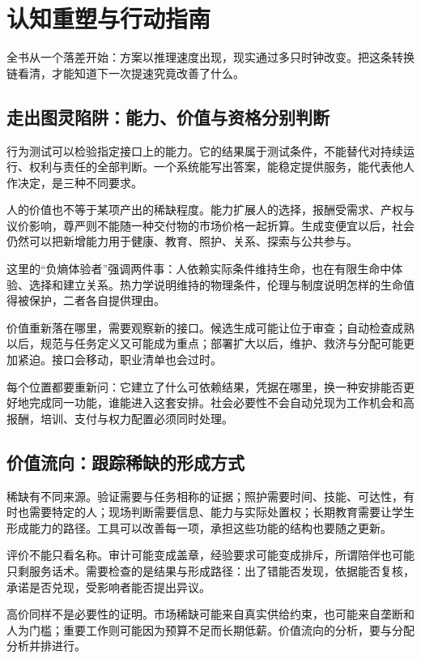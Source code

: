 \section{认知重塑与行动指南}

全书从一个落差开始：方案以推理速度出现，现实通过多只时钟改变。把这条转换链看清，才能知道下一次提速究竟改善了什么。

\subsection{走出图灵陷阱：能力、价值与资格分别判断}

行为测试可以检验指定接口上的能力。它的结果属于测试条件，不能替代对持续运行、权利与责任的全部判断。一个系统能写出答案，能稳定提供服务，能代表他人作决定，是三种不同要求。

人的价值也不等于某项产出的稀缺程度。能力扩展人的选择，报酬受需求、产权与议价影响，尊严则不能随一种交付物的市场价格一起折算。生成变便宜以后，社会仍然可以把新增能力用于健康、教育、照护、关系、探索与公共参与。

这里的“负熵体验者”强调两件事：人依赖实际条件维持生命，也在有限生命中体验、选择和建立关系。热力学说明维持的物理条件，伦理与制度说明怎样的生命值得被保护，二者各自提供理由。

价值重新落在哪里，需要观察新的接口。候选生成可能让位于审查；自动检查成熟以后，规范与任务定义又可能成为重点；部署扩大以后，维护、救济与分配可能更加紧迫。接口会移动，职业清单也会过时。

每个位置都要重新问：它建立了什么可依赖结果，凭据在哪里，换一种安排能否更好地完成同一功能，谁能进入这套安排。社会必要性不会自动兑现为工作机会和高报酬，培训、支付与权力配置必须同时处理。

\subsection{价值流向：跟踪稀缺的形成方式}

稀缺有不同来源。验证需要与任务相称的证据；照护需要时间、技能、可达性，有时也需要特定的人；现场判断需要信息、能力与实际处置权；长期教育需要让学生形成能力的路径。工具可以改善每一项，承担这些功能的结构也要随之更新。

评价不能只看名称。审计可能变成盖章，经验要求可能变成排斥，所谓陪伴也可能只剩服务话术。需要检查的是结果与形成路径：出了错能否发现，依据能否复核，承诺是否兑现，受影响者能否提出异议。

高价同样不是必要性的证明。市场稀缺可能来自真实供给约束，也可能来自垄断和人为门槛；重要工作则可能因为预算不足而长期低薪。价值流向的分析，要与分配分析并排进行。

